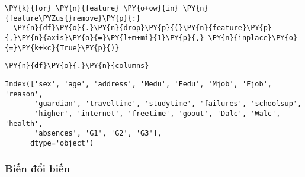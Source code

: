     \begin{tcolorbox}[breakable, size=fbox, boxrule=1pt, pad at break*=1mm,colback=cellbackground, colframe=cellborder]
\begin{Verbatim}[commandchars=\\\{\}]
\PY{k}{for} \PY{n}{feature} \PY{o+ow}{in} \PY{n}{feature\PYZus{}remove}\PY{p}{:}
  \PY{n}{df}\PY{o}{.}\PY{n}{drop}\PY{p}{(}\PY{n}{feature}\PY{p}{,}\PY{n}{axis}\PY{o}{=}\PY{l+m+mi}{1}\PY{p}{,} \PY{n}{inplace}\PY{o}{=}\PY{k+kc}{True}\PY{p}{)}
\end{Verbatim}
\end{tcolorbox}

    \begin{tcolorbox}[breakable, size=fbox, boxrule=1pt, pad at break*=1mm,colback=cellbackground, colframe=cellborder]
\begin{Verbatim}[commandchars=\\\{\}]
\PY{n}{df}\PY{o}{.}\PY{n}{columns}
\end{Verbatim}
\end{tcolorbox}

            \begin{tcolorbox}[breakable, size=fbox, boxrule=.5pt, pad at break*=1mm, opacityfill=0]
\begin{Verbatim}[commandchars=\\\{\}]
Index(['sex', 'age', 'address', 'Medu', 'Fedu', 'Mjob', 'Fjob', 'reason',
       'guardian', 'traveltime', 'studytime', 'failures', 'schoolsup',
       'higher', 'internet', 'freetime', 'goout', 'Dalc', 'Walc', 'health',
       'absences', 'G1', 'G2', 'G3'],
      dtype='object')
\end{Verbatim}
\end{tcolorbox}
        
    \hypertarget{biux1ebfn-ux111ux1ed5i-biux1ebfn}{%
\subsubsection{Biến đổi biến}\label{biux1ebfn-ux111ux1ed5i-biux1ebfn}}

